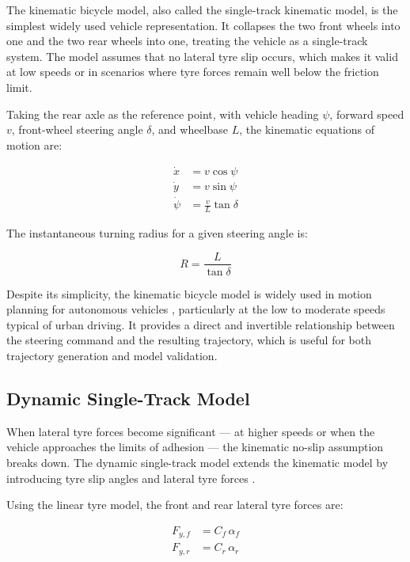 \documentclass[a4paper,12pt]{report}
\begin{document}
The kinematic bicycle model, also called the single-track kinematic model, is
the simplest widely used vehicle representation. It collapses the two front
wheels into one and the two rear wheels into one, treating the vehicle as a
single-track system. The model assumes that no lateral tyre slip occurs, which
makes it valid at low speeds or in scenarios where tyre forces remain well below
the friction limit.

Taking the rear axle as the reference point, with vehicle heading $\psi$,
forward speed $v$, front-wheel steering angle $\delta$, and wheelbase $L$, the
kinematic equations of motion are:

\begin{align}
\dot{x}    &= v \cos\psi                        \label{eq:bm_x} \\
\dot{y}    &= v \sin\psi                        \label{eq:bm_y} \\
\dot{\psi} &= \frac{v}{L}\tan\delta             \label{eq:bm_psi}
\end{align}

The instantaneous turning radius for a given steering angle is:

\begin{equation}
R = \frac{L}{\tan\delta}
\label{eq:turning_radius}
\end{equation}

Despite its simplicity, the kinematic bicycle model is widely used in motion
planning for autonomous vehicles \cite{kong2015}, particularly at the low to
moderate speeds typical of urban driving. It provides a direct and invertible
relationship between the steering command and the resulting trajectory, which
is useful for both trajectory generation and model validation.

\subsection{Dynamic Single-Track Model}

When lateral tyre forces become significant — at higher speeds or when the
vehicle approaches the limits of adhesion — the kinematic no-slip assumption
breaks down. The dynamic single-track model extends the kinematic model by
introducing tyre slip angles and lateral tyre forces \cite{rajamani2012}.

Using the linear tyre model, the front and rear lateral tyre forces are:

\begin{align}
F_{y,f} &= C_f \,\alpha_f \\
F_{y,r} &= C_r \,\alpha_r
\end{align}
\end{document}
